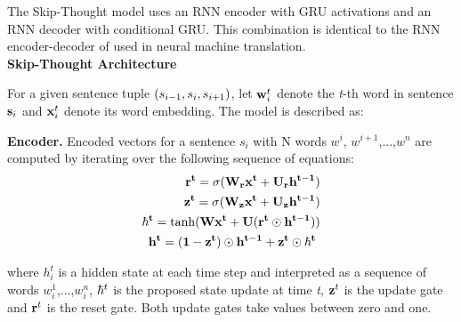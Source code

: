 \documentclass[11pt,a4paper]{article}
\begin{document}
The Skip-Thought model uses an RNN encoder with GRU activations \cite{gru}  
and an RNN decoder with conditional GRU. This combination is identical
to the RNN encoder-decoder of  used in neural machine translation.\\



\noindent \textbf{Skip-Thought Architecture}

\noindent For a given sentence tuple $\begin{mathbf}(s_{i-1}, s_{i}, s_{i+1} ) \end{mathbf}$,
let $\begin{mathbf}w_i^t \end{mathbf}$ denote the \textit{t}-th word in sentence $\begin{mathbf}s_{i}\end{mathbf}$ and $\begin{mathbf}x_i^t \end{mathbf}$ denote its word embedding.
The model is described as:

\textbf{Encoder.} Encoded vectors for a sentence \(s_i\) with N words \(w^i\), \(w^{i+1}\),...,\(w^n\) are computed by iterating over the following sequence of equations:
\begin{align*}
\begin{mathbf}{r^{t} = \sigma(W_r x^{t}+U_r h^{t-1})}\end{mathbf}\\
\begin{mathbf}{z^{t} = \sigma(W_z x^{t}+U_z h^{t-1})}\end{mathbf}\\
\begin{mathbf}{\hbar^{t} = \tanh(W x^{t}+U(r^{t} \odot h^{t-1}))}\end{mathbf}\\
\begin{mathbf}{h^{t} = (1-z^{t}) \odot h^{t-1}+ z^{t} \odot \hbar^{t}}\end{mathbf}\
\end{align*}

where \(h_i^t\) is a hidden state at each time step and 
interpreted as a sequence 
of words \(w_i^1\),...,\(w_i^n\), $\begin{mathbf}\hbar^{t}\end{mathbf}$
is the proposed state update at time \textit{t}, $\begin{mathbf}z^{t}\end{mathbf}$
is the update gate and $\begin{mathbf}r^{t}\end{mathbf}$ is the reset gate.
Both update gates take values between zero and one.
\end{document}
